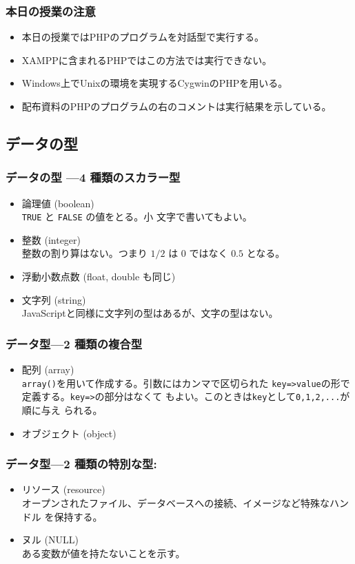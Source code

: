 \begin{frame}[containsverbatim]
 \frametitle{本日の授業の注意}
 \begin{itemize}
  \item 本日の授業ではPHPのプログラムを対話型で実行する。
  \item XAMPPに含まれるPHPではこの方法では実行できない。
  \item Windows上でUnixの環境を実現するCygwinのPHPを用いる。
  \item 配布資料のPHPのプログラムの右のコメントは実行結果を示している。
 \end{itemize}
\end{frame}
\subsection{データの型}
\begin{frame}[containsverbatim]
\frametitle{データの型 ---4 種類のスカラー型}
 \begin{itemize}
  \item 論理値 (boolean)\\\texttt{TRUE} と \texttt{FALSE} の値をとる。小
	文字で書いてもよい。
  \item 整数 (integer)\\整数の割り算はない。つまり $1/2$ は $0$ ではなく
	$0.5$ となる。
  \item 浮動小数点数 (float, double も同じ)
  \item 文字列 (string)\\
JavaScriptと同様に文字列の型はあるが、文字の型はない。
 \end{itemize}
\end{frame}
\begin{frame}[containsverbatim]
\frametitle{データ型---2 種類の複合型}
 \begin{itemize}
  \item 配列 (array)\\
\texttt{array()}を用いて作成する。引数にはカンマで区切られた
	\texttt{key=>value}の形で定義する。\texttt{key=>}の部分はなくて
	もよい。このときは\texttt{key}として\texttt{0,1,2,...}が順に与え
	られる。
  \item オブジェクト (object)
 \end{itemize}
\end{frame}
\begin{frame}[containsverbatim]
\frametitle{データ型---2 種類の特別な型:}
\begin{itemize}
 \item リソース (resource)\\
オープンされたファイル、データベースへの接続、イメージなど特殊なハンドル
       を保持する。
 \item ヌル (NULL)\\
ある変数が値を持たないことを示す。
\end{itemize}
\end{frame}
